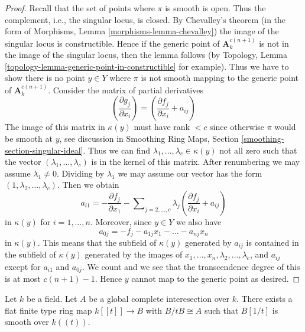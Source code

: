 \begin{proof}
Recall that the set of points where $\pi$ is smooth is open.
Thus the complement, i.e., the singular locus, is closed.
By Chevalley's theorem (in the form of
Morphisms, Lemma \ref{morphisms-lemma-chevalley})
the image of the singular locus is constructible.
Hence if the generic point of $\mathbf{A}^{c(n + 1)}_k$
is not in the image of the singular locus, then
the lemma follows (by Topology, Lemma
\ref{topology-lemma-generic-point-in-constructible} for example).
Thus we have to show there is no point
$y \in Y$ where $\pi$ is not smooth mapping to
the generic point of $\mathbf{A}^{c(n + 1)}_k$.
Consider the matrix of partial derivatives
$$
(\frac{\partial g_j}{\partial x_i}) =
(\frac{\partial f_j}{\partial x_i} + a_{ij})
$$
The image of this matrix in $\kappa(y)$ must have rank $< c$
since otherwise $\pi$ would be smooth at $y$, see discussion in
Smoothing Ring Maps, Section \ref{smoothing-section-singular-ideal}.
Thus we can find $\lambda_1, \ldots, \lambda_c \in \kappa(y)$
not all zero such that the vector $(\lambda_1, \ldots, \lambda_c)$
is in the kernel of this matrix.
After renumbering we may assume $\lambda_1 \not = 0$.
Dividing by $\lambda_1$ we may assume our vector has
the form $(1, \lambda_2, \ldots, \lambda_c)$.
Then we obtain
$$
a_{i1} = -
\frac{\partial f_j}{\partial x_1} -
\sum\nolimits_{j = 2, \ldots, c} \lambda_j(\frac{\partial f_j}{\partial x_i} + a_{ij})
$$
in $\kappa(y)$ for $i = 1, \ldots, n$. Moreover, since $y \in Y$ we also
have
$$
a_{0j} = -f_j - a_{1j}x_1 - \ldots - a_{nj}x_n
$$
in $\kappa(y)$. This means that the subfield of $\kappa(y)$
generated by $a_{ij}$ is contained in the subfield of $\kappa(y)$
generated by the images of $x_1, \ldots, x_n, \lambda_2, \ldots, \lambda_c$,
and $a_{ij}$ except for $a_{i1}$ and $a_{0j}$.
We count and we see that the transcendence degree of this is
at most $c(n + 1) - 1$. Hence $y$ cannot map to the generic point
as desired.
\end{proof}

\begin{lemma}
\label{lemma-smoothing-affine-lci}
Let $k$ be a field. Let $A$ be a global complete interesection
over $k$. There exists a flat finite type ring map
$k[[t]] \to B$ with $B/tB \cong A$ such that
$B[1/t]$ is smooth over $k((t))$.
\end{lemma}


